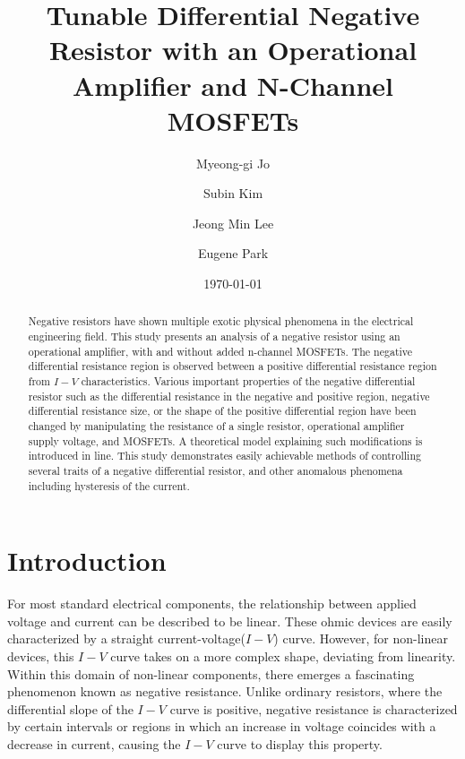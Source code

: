 \documentclass[%
 aip,
amsmath,amssymb,
reprint,
]{revtex4-1}
\begin{document}

\title[Intermediate Physics Laboratory 2, Module 2]{Tunable Differential Negative Resistor with an Operational Amplifier and N-Channel MOSFETs}
\author{Myeong-gi Jo}
\author{Subin Kim}
\author{Jeong Min Lee}
\author{Eugene Park}

\date{\today}
\begin{abstract}
Negative resistors have shown multiple exotic physical phenomena in the electrical engineering field. This study presents an analysis of a negative resistor using an operational amplifier, with and without added n-channel MOSFETs. The negative differential resistance region is observed between a positive differential resistance region from $I-V$ characteristics. Various important properties of the negative differential resistor such as the differential resistance in the negative and positive region, negative differential resistance size, or the shape of the positive differential region have been changed by manipulating the resistance of a single resistor, operational amplifier supply voltage, and MOSFETs. A theoretical model explaining such modifications is introduced in line. This study demonstrates easily achievable methods of controlling several traits of a negative differential resistor, and other anomalous phenomena including hysteresis of the current.
\end{abstract}

\maketitle

\section{\label{sec:Intro} Introduction} 

For most standard electrical components, the relationship between applied voltage and current can be described to be linear. These ohmic devices are easily characterized by a straight current-voltage(\(I-V\)) curve. However, for non-linear devices, this \(I-V\) curve takes on a more complex shape, deviating from linearity. Within this domain of non-linear components, there emerges a fascinating phenomenon known as negative resistance. Unlike ordinary resistors, where the differential slope of the \(I-V\) curve is positive, negative resistance is characterized by certain intervals or regions in which an increase in voltage coincides with a decrease in current, causing the \(I-V\) curve to display this property. 
\end{document}
